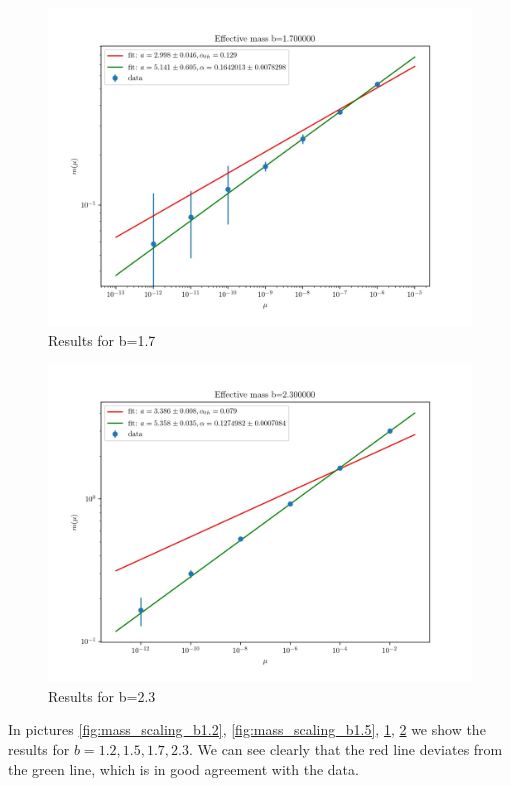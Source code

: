 \documentclass[12pt,a4paper]{report}
\begin{document}
\begin{figure}
\centering
\includegraphics[width=1.0\textwidth]{b1_7}
\caption{Results for b=1.7}
\label{fig:mass_scaling_b1.7}
\end{figure}
  
 \begin{figure}
\centering
\includegraphics[width=1.0\textwidth]{b2_3}
\caption{Results for b=2.3}
\label{fig:mass_scaling_b2.3}
\end{figure}

In pictures \ref{fig:mass_scaling_b1.2}, \ref{fig:mass_scaling_b1.5}, \ref{fig:mass_scaling_b1.7}, \ref{fig:mass_scaling_b2.3} we show the results for $b=1.2,1.5,1.7,2.3$. We can see clearly that the red line deviates from the green line, which is in good agreement with the data. 
\end{document}
